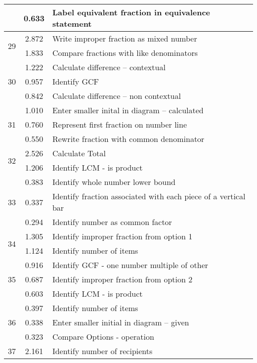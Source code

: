 \begin{longtable}[c]{|c|c|l|}
 & \small 0.633 & \small Label equivalent fraction in equivalence statement \\
\hline
\multirow{2}{*}{\small 29} & \small 2.872 & \small Write improper fraction as mixed number \\
 & \small 1.833 & \small Compare fractions with like denominators \\
\hline
\multirow{3}{*}{\small 30} & \small 1.222 & \small Calculate difference -- contextual \\
 & \small 0.957 & \small Identify GCF \\
 & \small 0.842 & \small Calculate difference -- non contextual \\
\hline
\multirow{3}{*}{\small 31} & \small 1.010 & \small Enter smaller inital in diagram -- calculated \\
 & \small 0.760 & \small Represent first fraction on number line \\
 & \small 0.550 & \small Rewrite fraction with common denominator \\
\hline
\multirow{2}{*}{\small 32} & \small 2.526 & \small Calculate Total \\
 & \small 1.206 & \small Identify LCM - is product \\
\hline
\multirow{3}{*}{\small 33} & \small 0.383 & \small Identify whole number lower bound \\
 & \small 0.337 & \small Identify fraction associated with each piece of a vertical bar \\
 & \small 0.294 & \small Identify number as common factor \\
\hline
\multirow{2}{*}{\small 34} & \small 1.305 & \small Identify improper fraction from option 1 \\
 & \small 1.124 & \small Identify number of items \\
\hline
\multirow{3}{*}{\small 35} & \small 0.916 & \small Identify GCF - one number multiple of other \\
 & \small 0.687 & \small Identify improper fraction from option 2 \\
 & \small 0.603 & \small Identify LCM - is product \\
\hline
\multirow{3}{*}{\small 36} & \small 0.397 & \small Identify number of items \\
 & \small 0.338 & \small Enter smaller initial in diagram -- given \\
 & \small 0.323 & \small Compare Options - operation \\
\hline
\multirow{1}{*}{\small 37} & \small 2.161 & \small Identify number of recipients \\

\end{longtable}
